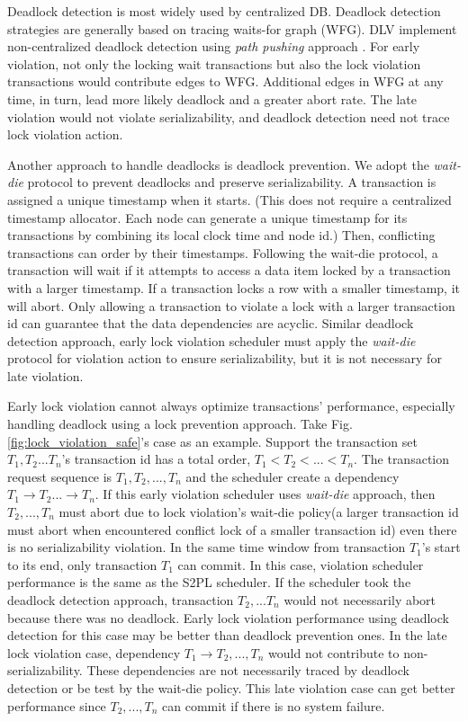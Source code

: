 \documentclass[conference]{IEEEtran}
\begin{document}
Deadlock detection is most widely used by centralized DB.
Deadlock detection strategies are generally
based on tracing waits-for graph (WFG).
DLV implement non-centralized deadlock detection using \emph{path pushing} approach . 
For early violation, 
not only the locking wait transactions but also the lock violation transactions would contribute edges to WFG. 
Additional edges in WFG at any time, in turn, lead more likely deadlock and a greater abort rate.
The late violation would not violate serializability, and  
deadlock detection need not trace lock violation action.

Another approach to handle deadlocks is deadlock prevention.
We adopt the \emph{wait-die} protocol to prevent deadlocks and preserve serializability.
A transaction is assigned a unique timestamp when it starts.
(This does not require a centralized timestamp allocator.
Each node can generate a unique timestamp for its transactions by combining its local clock time and node id.)
Then, conflicting transactions can order by their timestamps.
Following the wait-die protocol, a transaction will wait if it attempts to access a data item locked by a transaction with a larger timestamp.
If a transaction locks a row with a smaller timestamp, it will abort.
Only allowing a transaction to violate a lock with a larger transaction id can guarantee that the data dependencies are acyclic.
Similar deadlock detection approach,
early lock violation scheduler must apply the \emph{wait-die} protocol for violation action to ensure serializability, but it is not necessary for late violation.

Early lock violation cannot always optimize transactions' performance, especially handling deadlock using a lock prevention approach. 
Take Fig.\ref{fig:lock_violation_safe}'s case as an example.
Support the transaction set ${T_1, T_2... T_n}$'s transaction id has a total order, ${T_1 < T_2 < ... < T_n}$.
The transaction request sequence is ${T_1, T_2, ..., T_n}$ and the scheduler create a dependency ${T_1 \rightarrow T_2 ... \rightarrow T_n}$.
If this early violation scheduler uses \emph{wait-die} approach, then ${T_2, ..., T_n}$ must abort due to lock violation's wait-die policy(a larger transaction id must abort when encountered conflict lock of a smaller transaction id) even there is no serializability violation.
In the same time window from transaction ${T_1}$'s start to its end, only transaction ${T_1}$ can commit.
In this case, violation scheduler performance is the same as the S2PL scheduler.
If the scheduler took the deadlock detection approach, transaction ${T_2, ... T_n}$ would not necessarily abort because there was no deadlock.
Early lock violation performance using deadlock detection for this case may be better than deadlock prevention ones.
In the late lock violation case, dependency ${T_1 \rightarrow T_2 , ... ,T_n}$ would not contribute to non-serializability.
These dependencies are not necessarily traced by deadlock detection or be test by the wait-die policy.
This late violation case can get better performance since ${T_2,..., T_n}$ can commit if there is no system failure.
\end{document}
